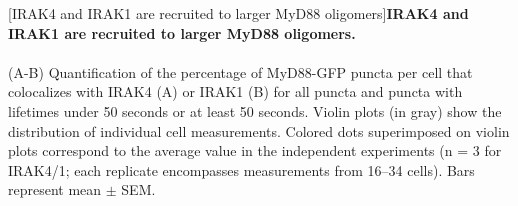 \begin{centering}
\captionsetup{parbox=none}
[IRAK4 and IRAK1 are recruited to larger MyD88 oligomers]{\textbf{IRAK4 and IRAK1 are recruited to larger MyD88 oligomers.}
\\
\\
(A-B) Quantification of the percentage of MyD88-GFP puncta per cell that colocalizes with IRAK4 (A) or IRAK1 (B) for all puncta and puncta with lifetimes under 50 seconds or at least 50 seconds. Violin plots (in gray) show the distribution of individual cell measurements. Colored dots superimposed on violin plots correspond to the average value in the independent experiments (n = 3 for IRAK4/1; each replicate encompasses measurements from 16--34 cells). Bars represent mean $\pm$ SEM.
}
\end{centering}
